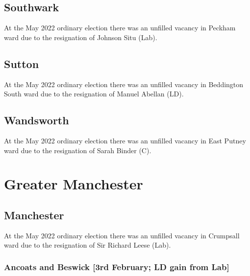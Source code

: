 \documentclass[a4paper,openany]{book}
\begin{document}
\begin{resultsiii}
\subsection*{Southwark}

At the May 2022 ordinary election there was an unfilled vacancy in Peckham ward due to the resignation of Johnson Situ (Lab).%

\subsection*{Sutton}

At the May 2022 ordinary election there was an unfilled vacancy in Beddington South ward due to the resignation of Manuel Abellan (LD).%

\subsection*{Wandsworth}

At the May 2022 ordinary election there was an unfilled vacancy in East Putney ward due to the resignation of Sarah Binder (C).%

\section{Greater Manchester}

\subsection*{Manchester}

At the May 2022 ordinary election there was an unfilled vacancy in Crumpsall ward due to the resignation of Sir Richard Leese (Lab).%

\subsubsection*{Ancoats and Beswick \hspace*{\fill}\nolinebreak[1]%
	\enspace\hspace*{\fill}
	[3rd February; LD gain from Lab]}



\end{resultsiii}
\end{document}
